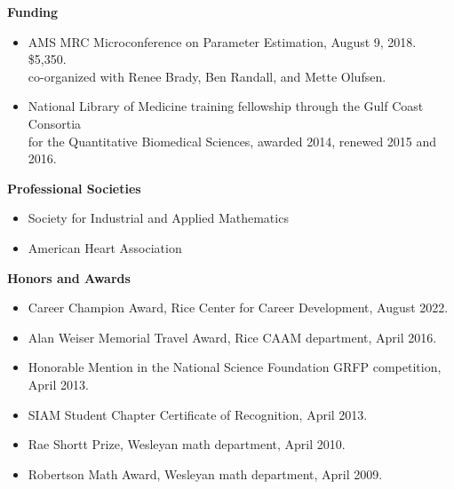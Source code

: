 \documentclass{article} %
\begin{document}
\vspace{0.5cm}
\noindent
{\bf \large Funding}
\begin{itemize}
\item AMS MRC Microconference on Parameter Estimation, August 9, 2018. \$5,350.\\
co-organized with Renee Brady, Ben Randall, and Mette Olufsen.
\item National Library of Medicine training fellowship through the Gulf Coast Consortia \\ for the Quantitative Biomedical Sciences, awarded 2014, renewed 2015 and 2016.
\end{itemize}


\vspace{2cm}
\noindent
{\bf \large Professional Societies}
\begin{itemize}
\item Society for Industrial and Applied Mathematics
\item American Heart Association
\end{itemize}

\vspace{0.5cm}
\noindent
{\bf \large Honors and Awards}
\begin{itemize}
\item Career Champion Award, Rice Center for Career Development, August 2022.
\item Alan Weiser Memorial Travel Award, Rice CAAM department, April 2016.
\item Honorable Mention in the National Science Foundation GRFP competition, April 2013.
\item SIAM Student Chapter Certificate of Recognition, April 2013. 
\item Rae Shortt Prize, Wesleyan math department, April 2010. 
\item Robertson Math Award, Wesleyan math department, April 2009. 
\end{itemize}

\end{document}
